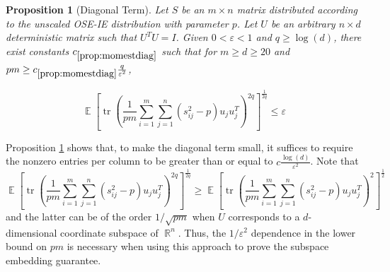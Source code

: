 \documentclass[11pt]{amsart}
\numberwithin{equation}{section}
\numberwithin{equation}{section}
\DeclareMathOperator{\E}{\mathbb{E}}
\DeclareMathOperator{\R}{\mathbb{R}}
\DeclareMathOperator*{\tr}{tr}
\newtheorem{proposition}[theorem]{Proposition}
\theoremstyle{remark}
\theoremstyle{definition}
\begin{document}
\begin{proposition}[Diagonal Term] \label{prop:momestdiag}
    Let $S$ be an $m \times n$ matrix distributed according to the unscaled OSE-IE distribution with parameter $p$. Let $U$ be an arbitrary $n \times d$ deterministic matrix such that $U^TU=I$. Given $0< \varepsilon < 1$ and $q \ge \log(d) $, there exist constants $c_{\ref*{prop:momestdiag}}$ such that for $m \geq d \ge 20$ and $pm \geq c_{\ref*{prop:momestdiag}} \frac{q }{\varepsilon^2} $,

\[ \E \left[ \tr \left( \frac{1}{pm }\sum_{i=1}^m \sum_{j =1}^n (s_{ij}^2 - p)u_ju_{j}^T \right)^{2q} \right]^\frac{1}{2q} \leq  \varepsilon \]

\end{proposition}
Proposition \ref{prop:momestdiag} shows that, to make the diagonal term small, it suffices to require the nonzero entries per column to be greater than or equal to $c\frac{\log(d)}{\varepsilon^2}$. Note that
    \[ \E \left[ \tr \left( \frac{1}{pm }\sum_{i=1}^m \sum_{j =1}^n (s_{ij}^2 - p)u_ju_{j}^T \right)^{2q} \right]^\frac{1}{2q} \ge  \E \left[ \tr \left( \frac{1}{pm }\sum_{i=1}^m \sum_{j =1}^n (s_{ij}^2 - p)u_ju_{j}^T \right)^{2} \right]^\frac{1}{2} \]
    and the latter can be of the order $1/\sqrt{pm}$ when $U$ corresponds to a $d$-dimensional coordinate subspace of $\R^n$. Thus, the $1/\varepsilon^2$ dependence in the lower bound on $pm$ is necessary when using this approach to prove the subspace embedding guarantee.
\end{document}
